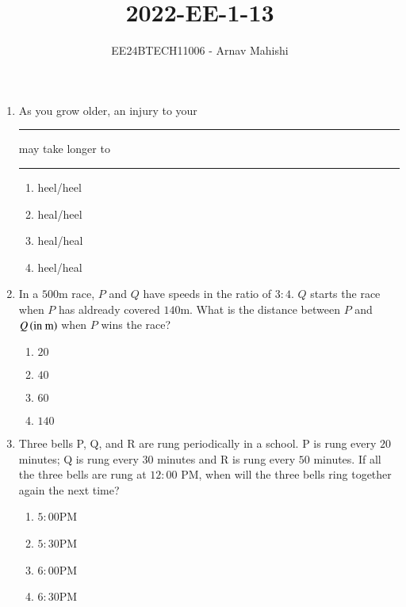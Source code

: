 \documentclass[journal]{IEEEtran}
\begin{document}

\vspace{3cm}

\title{2022-EE-1-13}
\author{EE24BTECH11006 - Arnav Mahishi}
{\let\newpage\relax\maketitle}
\begin{enumerate}
\item{
As you grow older, an injury to your \rule{1cm}{0.15mm} may take longer to \rule{1cm}{0.15mm}
\begin{multicols}{4}
\begin{enumerate}
\item heel/heel
\item heal/heel
\item heal/heal 
\item heel/heal
\end{enumerate}
\end{multicols}
}
\item{
In a $500$m race, $P$ and $Q$ have speeds in the ratio of $3:4$. $Q$ starts the race when $P$ has aldready covered $140$m. What is the distance between $P$ and $Q\left(\text{in m}\right)$ when $P$ wins the race?
\begin{multicols}{4}
\begin{enumerate}
\item $20$
\item $40$
\item $60$
\item $140$
\end{enumerate}
\end{multicols}}
\item{
Three bells P, Q, and R are rung periodically in a school. P is rung every $20$ minutes; Q is rung every $30$ minutes and R is rung every $50$ minutes.
If all the three bells are rung at $12:00$ PM, when will the three bells ring together again the next time?
\begin{multicols}{4}
\begin{enumerate}
\item $5:00$PM
\item $5:30$PM
\item $6:00$PM
\item $6:30$PM
\end{enumerate}

\end{multicols}}
\end{enumerate}
\end{document}
